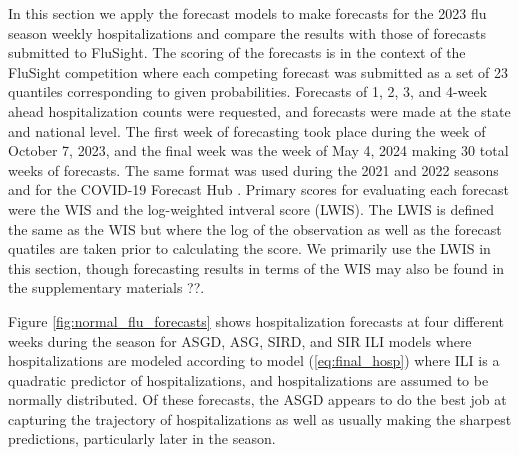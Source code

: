 In this section we apply the forecast models to make forecasts for the 2023 
flu season weekly hospitalizations and compare the results with those of 
forecasts submitted to FluSight. The scoring of the forecasts is in the 
context of the FluSight competition where each competing forecast was 
submitted as a set of 23 quantiles corresponding to given probabilities.
Forecasts of 1, 2, 3, and 4-week ahead hospitalization counts were requested, 
and forecasts were made at the state and national level. The first week of 
forecasting took place during the week of October 7, 2023, and the final week 
was the week of May 4, 2024 making 30 total weeks of forecasts.
 The same format was used during the 2021 and 2022 seasons and for the 
 COVID-19 Forecast Hub \cite[]{mathis2024evaluation, bracher2021evaluating}. 
 Primary scores for evaluating each forecast were the WIS and the 
 log-weighted intveral score (LWIS). The LWIS is defined the same as the WIS
 but where the log of the observation as well as the forecast quatiles are taken
 prior to calculating the score. We primarily use the LWIS in this section,
 though forecasting results in terms of the WIS may also be found in the 
 supplementary materials ??.
 

Figure \ref{fig:normal_flu_forecasts} shows hospitalization forecasts at 
four different weeks during the season for ASGD, ASG, SIRD, and SIR ILI models
where hospitalizations are modeled according to model (\ref{eq:final_hosp})
where ILI is a quadratic predictor of hospitalizations, and hospitalizations
are assumed to be normally distributed. Of these forecasts, the ASGD appears 
to do the best job at capturing the trajectory of hospitalizations as well
as usually making the sharpest predictions, particularly later in the season. 

